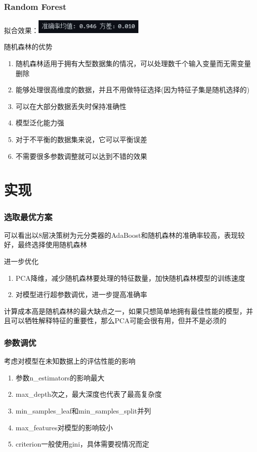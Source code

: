 \documentclass[aspectratio=43, 12pt, utf8, mathserif]{ctexbeamer} %
\begin{document}
\begin{frame}
    \frametitle{Random Forest}
    拟合效果：\includegraphics[width=0.4\textwidth]{image/randomforest.jpg}
    \begin{block}{随机森林的优势}
    \begin{enumerate}
        \item 随机森林适用于拥有大型数据集的情况，可以处理数千个输入变量而无需变量删除
        \item 能够处理很高维度的数据，并且不用做特征选择(因为特征子集是随机选择的)
        \item 可以在大部分数据丢失时保持准确性
        \item 模型泛化能力强
        \item 对于不平衡的数据集来说，它可以平衡误差
        \item 不需要很多参数调整就可以达到不错的效果
    \end{enumerate}
    \end{block}
\end{frame}

\section{实现}
\begin{frame}
    \frametitle{选取最优方案}
    可以看出以8层决策树为元分类器的AdaBoost和随机森林的准确率较高，表现较好，最终选择使用随机森林
    
    \vspace{0.5cm}
    进一步优化
    \begin{enumerate}
        \item PCA降维，减少随机森林要处理的特征数量，加快随机森林模型的训练速度
        \item 对模型进行超参数调优，进一步提高准确率
    \end{enumerate}
    \vspace{0.5cm}
    计算成本高是随机森林的最大缺点之一，如果只想简单地拥有最佳性能的模型，并且可以牺牲解释特征的重要性，那么PCA可能会很有用，但并不是必须的
\end{frame}

\begin{frame}
    \frametitle{参数调优}
    考虑对模型在未知数据上的评估性能的影响
    \vspace{1cm}
    \begin{enumerate}
        \item 参数n\_estimators的影响最大
        \item max\_depth次之，最大深度也代表了最高复杂度
        \item min\_samples\_leaf和min\_samples\_split并列
        \item max\_features对模型的影响较小
        \item criterion一般使用gini，具体需要视情况而定
    \end{enumerate}
\end{frame}
\end{document}
